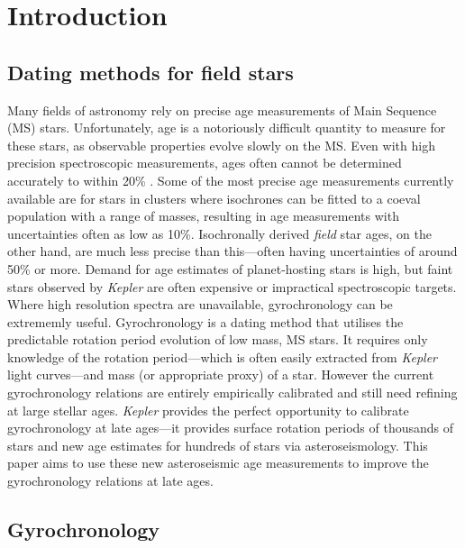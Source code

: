 \documentclass[11pt,preprint]{aastex}
\begin{document}
\section{Introduction}
\label{intro}
\subsection{Dating methods for field stars}

Many fields of astronomy rely on precise age measurements of Main Sequence (MS) stars.
Unfortunately, age is a notoriously difficult quantity to measure for these stars, as observable properties evolve slowly on the MS.
Even with high precision spectroscopic measurements, ages often cannot be determined accurately to within 20\% \citep{Soderblom2010}.
Some of the most precise age measurements currently available are for stars in clusters where isochrones can be fitted to a coeval population with a range of masses, resulting in age measurements with uncertainties often as low as 10\%.
Isochronally derived {\it field} star ages, on the other hand, are much less precise than this---often having uncertainties of around 50\% or more.
Demand for age estimates of planet-hosting stars is high, but faint stars observed by {\it Kepler} are often expensive or impractical spectroscopic targets.
Where high resolution spectra are unavailable, gyrochronology can be extrememly useful.
Gyrochronology is a dating method that utilises the predictable rotation period evolution of low mass, MS stars.
It requires only knowledge of the rotation period---which is often easily extracted from {\it Kepler} light curves---and mass (or appropriate proxy) of a star.
However the current gyrochronology relations are entirely empirically calibrated and still need refining at large stellar ages.
{\it Kepler} provides the perfect opportunity to calibrate gyrochronology at late ages---it provides surface rotation periods of thousands of stars and new age estimates for hundreds of stars via asteroseismology.
This paper aims to use these new asteroseismic age measurements to improve the gyrochronology relations at late ages.

\subsection{Gyrochronology}
\end{document}
